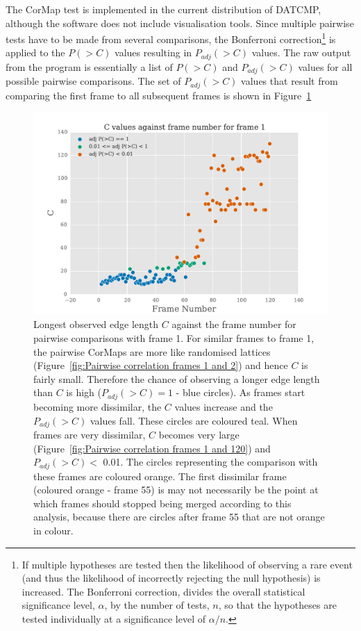 The CorMap test is implemented in the current distribution of DATCMP, although the software does not include visualisation tools.
Since multiple pairwise tests have to be made from several comparisons, the Bonferroni correction\footnote{If multiple hypotheses are tested then the likelihood of observing a rare event (and thus the likelihood of incorrectly rejecting the null hypothesis) is increased. The Bonferroni correction, divides the overall statistical significance level, $\alpha$, by the number of tests, $n$, so that the hypotheses are tested individually at a significance level of $\alpha/n$.} is applied to the $P(>C)$ values resulting in $P_{adj}(>C)$ values.
The raw output from the program is essentially a list of $P(>C)$ and $P_{adj}(>C)$ values for all possible pairwise comparisons.
The set of $P_{adj}(>C)$ values that result from comparing the first frame to all subsequent frames is shown in Figure~\ref{fig:p values for comparisons with frame 1}
\begin{figure}
    \centering
    \includegraphics[width=1.0\textwidth]{figures/saxs/scatter_asc_10.pdf}
    \caption[Longest observed edge length against the frame number for pairwise comparisons with frame 1.]{Longest observed edge length $C$ against the frame number for pairwise comparisons with frame 1.
    For similar frames to frame 1, the pairwise CorMaps are more like randomised lattices (Figure~\ref{fig:Pairwise correlation frames 1 and 2}) and hence $C$ is fairly small.
    Therefore the chance of observing a longer edge length than $C$ is high ($P_{adj}(>C) = 1$ - blue circles).
    As frames start becoming more dissimilar, the $C$ values increase and the $P_{adj}(>C)$ values fall.
    These circles are coloured teal.
    When frames are very dissimilar, $C$ becomes very large (Figure~\ref{fig:Pairwise correlation frames 1 and 120}) and $P_{adj}(>C) <$ 0.01.
    The circles representing the comparison with these frames are coloured orange.
    The first dissimilar frame (coloured orange - frame 55) is may not necessarily be the point at which frames should stopped being merged according to this analysis, because there are circles after frame 55 that are not orange in colour.}
    \label{fig:p values for comparisons with frame 1}
\end{figure}

